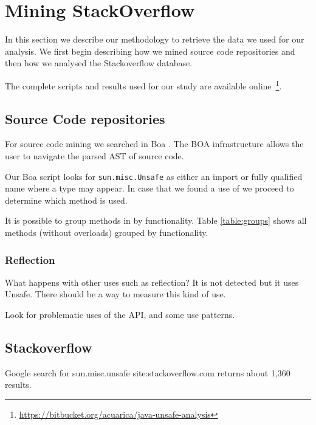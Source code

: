
\section{Mining StackOverflow} \label{sec:methodologyso}

In this section we describe our methodology to retrieve the data we used for our analysis.
We first begin describing how we mined source code repositories and then how we analysed the Stackoverflow database.

The complete scripts and results used for our study are available online~\footnote{\url{https://bitbucket.org/acuarica/java-unsafe-analysis}}.

\subsection{Source Code repositories}

For source code mining we searched in Boa \cite{Dyer-Nguyen-Rajan-Nguyen-13}. 
The BOA infrastructure allows the user to navigate the parsed AST of source code.

Our Boa script looks for \texttt{sun.misc.Unsafe} as either an import or fully qualified name where a type may appear.
In case that we found a use of \smu{} we proceed to determine which method is used.


It is possible to group methods in \smu{} by functionality.
Table \ref{table:groups} shows all methods (without overloads) grouped by functionality.



\subsubsection*{Reflection}


What happens with other uses such as reflection? It is not detected but it uses Unsafe. There should be a way to measure this kind of use.

Look for problematic uses of the API, and some use patterns.


\subsection{Stackoverflow}

Google search for sun.misc.unsafe site:stackoverflow.com
returns about 1,360 results.
